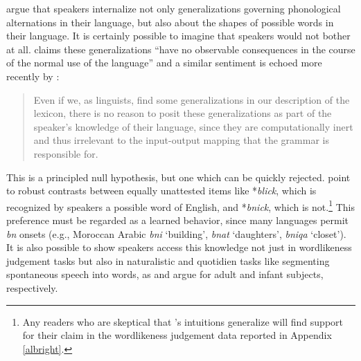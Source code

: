 \label{turkish}

\citet{Chomsky1965} argue that speakers internalize not only generalizations governing phonological alternations in their language, but also about the shapes of possible words in their language. It is certainly possible to imagine that speakers would not bother at all. \citet[][320]{Zimmer1969} claims these generalizations ``have no observable consequences in the course of the normal use of the language'' and a similar sentiment is echoed more recently by \citeauthor{PE}:

\begin{quote}
Even if we, as linguists, find some generalizations in our description of the lexicon, there is no reason to posit these generalizations as part of the speaker's knowledge of their language, since they are computationally inert and thus irrelevant to the input-output mapping that the grammar is responsible for. \citep[][18]{PE}
\end{quote}

This is a principled null hypothesis, but one which can be quickly rejected. \citeauthor{Chomsky1965} point to robust contrasts between equally unattested items like *\emph{blick}, which is recognized by speakers a possible word of English, and *\emph{bnick}, which is not.\footnote{Any readers who are skeptical that \citeauthor{Chomsky1965}'s intuitions generalize will find support for their claim in the wordlikeness judgement data reported in Appendix \ref{albright}.}
This preference must be regarded as a learned behavior, since many languages permit  \emph{bn} onsets (e.g., Moroccan Arabic \emph{bni} `building', \emph{bnat} `daughters', \emph{bniqa} `closet'). It is also possible to show speakers access this knowledge not just in wordlikeness judgement tasks but also in naturalistic and quotidien tasks like segmenting spontaneous speech into words, as \citet{McQueen1998} and \citet{Mattys2001b} argue for adult and infant subjects, respectively.

